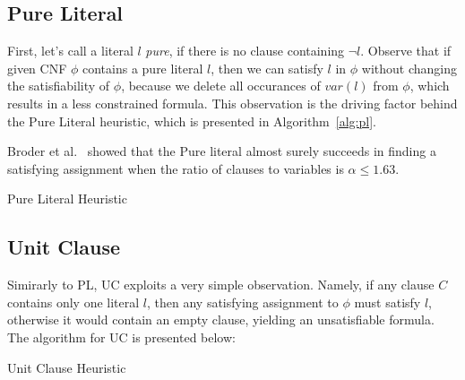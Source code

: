 \documentclass[10pt]{article}
\begin{document}
\subsection{Pure Literal}
\par
First, let's call a literal $l$ \textit{pure}, if there is no clause containing $\neg l$. Observe that if given CNF $\phi$ contains a pure literal $l$, then we can satisfy $l$ in $\phi$ without changing the satisfiability of $\phi$, because we delete all occurances of $var(l)$ from $\phi$, which results in a less constrained formula.
This observation is the driving factor behind the Pure Literal heuristic, which is presented in Algorithm~\ref{alg:pl}. 
\par
Broder et al.~\cite{pureliteral} showed that the Pure literal almost surely succeeds in finding a satisfying assignment when the ratio of clauses to variables is $\alpha \le 1.63$. 
\begin{algorithm}
\caption{Pure Literal Heuristic}\label{alg:pl}


\end{algorithm}



\subsection{Unit Clause}
Simirarly to PL, UC exploits a very simple observation. Namely, if any clause $C$ contains only one literal $l$, then any satisfying assignment to $\phi$ must satisfy $l$, otherwise it would contain an empty clause, yielding an unsatisfiable formula. The algorithm for UC is presented below:
\begin{algorithm}
\caption{Unit Clause Heuristic}\label{alg:uc}
\end{algorithm}
\end{document}
